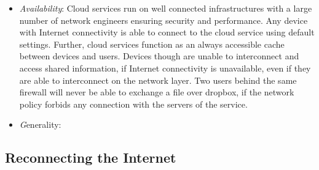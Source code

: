 \begin{itemize}
\item {\it Availability}: Cloud services run on well connected infrastructures
      with a large number of network engineers ensuring security and
      performance.  Any device with Internet connectivity is able to connect to
      the cloud service using default settings. Further, cloud services function
      as an always accessible cache between devices and users.  Devices though
      are unable to interconnect and access shared information, if Internet
      connectivity is unavailable, even if they are able to interconnect on the
      network layer.  Two users behind the same firewall will never be able to
      exchange a file over dropbox, if the network policy forbids any connection
      with the servers of the service. 
\item {\emph Generality}: 

\end{itemize}


\subsection{Reconnecting the Internet}\label{sec:signpost-design}

